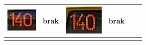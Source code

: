 \begin{table}[h!]
\begin{tabular}{ | c | l | c | l | c | l | }
\begin{minipage}{.2\textwidth}
      \includegraphics[width=\textwidth]{img/exp_number_f05}
    \end{minipage}
    &
     brak
    &
    \begin{minipage}{.2\textwidth}
      \includegraphics[width=\textwidth]{img/exp_number_f06}
    \end{minipage}
    &
     brak
    \\
    \hline
    \begin{minipage}{.2\textwidth}

\end{minipage}
\end{tabular}
\end{table}
